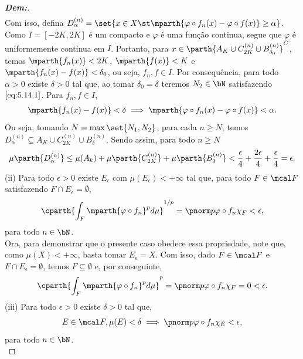 \begin{proof}[\textbf{Dem:}]
\begin{align*}
  \end{align*}
  Com isso, defina $D^{(n)}_{\alpha} = \set{x \in X \st 
  \mparth{\varphi \circ f_n(x) - \varphi\circ f(x)}\ge \alpha}$. Como $I=[-2K, 2K]$
  é um compacto e $\varphi$ é uma função continua, segue que $\varphi$ é uniformemente
  continua em $I$. Portanto, para $x \in \parth{A_K 
  \cup C_{2K}^{(n)} \cup B_{\delta_0}^{(n)}}^C$, temos 
  $\mparth{f_n(x)}< 2K$, $\mparth{f(x)}<K$ e $\mparth{f_n(x) - f(x)} < \delta_0$,
  ou seja, $f_n, f \in I$. Por consequência, para todo 
  $\alpha > 0$ existe 
  $\delta > 0$ tal que, ao tomar $\delta_0 = \delta$ teremos 
  $N_2 \in \bN$ satisfazendo $\eqref{eq:5.14.1}$. Para $f_n, f \in I$, 
  \begin{align*}
     \mparth{f_n(x) - f(x)}<\delta \implies 
    \mparth{\varphi\circ f_n(x) -\varphi\circ f(x)} < \alpha.
  \end{align*}
  Ou seja, tomando $N = \max\set{N_1, N_2}$,
  para cada $n \ge N$, temos 
  $D_{\alpha}^{(n)} \subseteq A_K \cup C_{2K}^{(n)} \cup B_{\delta}^{(n)}$.
  Sendo assim, para todo $n \ge N$
  \begin{align*}
   \mu\parth{D_\alpha^{(n)}} \le \mu(A_k) + \mu\parth{C_{2K}^{(n)}} 
    + \mu\parth{B_\delta^{(n)}}<
    \frac{\epsilon}{4} + \frac{2\epsilon}{4} + \frac{\epsilon}{4} = \epsilon.
  \end{align*}
  (ii) Para todo $\epsilon>0$ existe $E_\epsilon$ com $\mu(E_\epsilon)<+\infty$
  tal que, para todo $F \in \mcal F$ satisfazendo $F \cap E_\epsilon = \emptyset$, 
  \begin{align*}
    \cparth{\int_F \mparth{\varphi \circ f_n}^p d\mu}^{1/p} 
    = \pnorm p {\varphi \circ f_n \chi_F} < \epsilon,
  \end{align*}
  para todo $n \in \bN$. \\
  Ora, para demonstrar que o presente caso obedece essa propriedade,
  note que, como $\mu(X)< +\infty$, basta tomar $E_\epsilon = X$. 
  Com isso, dado $F \in \mcal F$ e $F \cap E_\epsilon = \emptyset$, temos 
  $F \subseteq \emptyset$ e, por conseguinte, 
  \begin{align*}
    \cparth{\int_F \mparth{\varphi \circ f_n}^p d\mu}^p 
    = \pnorm p {\varphi \circ f_n \chi_F} = 0 < \epsilon.
  \end{align*}
  (iii) Para todo $\epsilon >0$ existe $\delta >0$ tal que, 
  \begin{align*}
    E\in \mcal F, \mu(E)< \delta \implies \pnorm p {\varphi \circ f_n\chi_E} < \epsilon, 
  \end{align*}
  para todo $n \in \bN$. \\  

\end{proof}
